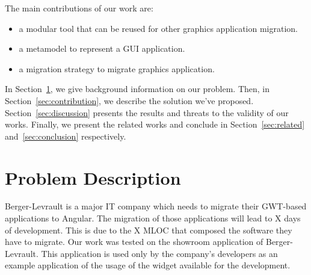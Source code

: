 \documentclass[conference]{IEEEtran}
\begin{document}

The main contributions of our work are:
\begin{itemize}

    \item a modular tool that can be reused for other graphics application migration.

    \item a metamodel to represent a GUI application.

    \item a migration strategy to migrate graphics application.
    
\end{itemize}


In Section~\ref{sec:problem}, we give background information on our problem. 
Then, in Section~\ref{sec:contribution}, we describe the solution we've proposed.
Section~\ref{sec:discussion} presents the results and threats to the validity of our works.
Finally, we present the related works and conclude in Section~\ref{sec:related} and~\ref{sec:conclusion} respectively.

\section{Problem Description}
\label{sec:problem}


Berger-Levrault is a major IT company which needs to migrate
    their GWT-based applications to Angular.
The migration of those applications will lead to X days of development.
This is due to the X MLOC that composed the software they have to migrate.
Our work was tested on the showroom application of Berger-Levrault. 
This application is used only by the company's developers as
    an example application of the usage of the widget available for the development.


\end{document}
